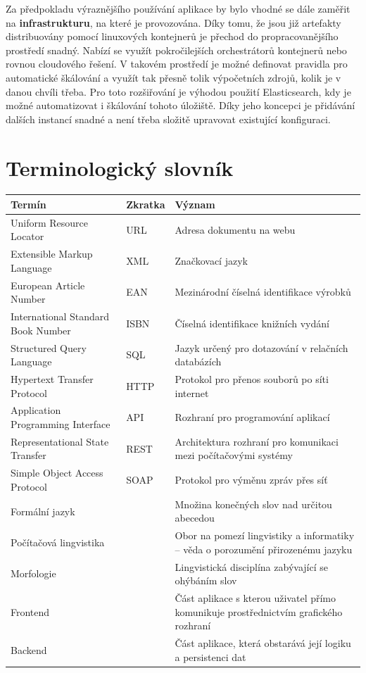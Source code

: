 \documentclass[FM,DP]{tulthesis}
\begin{document}
Za předpokladu výraznějšího používání aplikace by bylo vhodné se dále zaměřit na \textbf{infrastrukturu}, 
na které je provozována. Díky tomu, že jsou již artefakty distribuovány pomocí linuxových kontejnerů
je přechod do propracovanějšího prostředí snadný. Nabízí se využít pokročilejších orchestrátorů
kontejnerů nebo rovnou cloudového řešení. V takovém prostředí je možné definovat pravidla pro automatické
škálování a využít tak přesně tolik výpočetních zdrojů, kolik je v danou chvíli třeba. Pro
toto rozšiřování je výhodou použití Elasticsearch, kdy je možné automatizovat i škálování
tohoto úložiště. Díky jeho koncepci je přidávání dalších instancí snadné a není třeba složitě
upravovat existující konfiguraci.

\appendix

\chapter{Terminologický slovník}

\begin{center}

\begin{tabular}{L{50mm} L{17mm} L{73mm}} 
\toprule
\textbf{Termín} & \textbf{Zkratka} & \textbf{Význam} \\
\midrule
Uniform Resource Locator & URL & Adresa dokumentu na webu\\
\hline
Extensible Markup Language & XML & Značkovací jazyk\\
\hline
European Article Number & EAN & Mezinárodní číselná identifikace výrobků\\
\hline
International Standard Book Number & ISBN & Číselná identifikace knižních vydání\\
\hline
Structured Query Language & SQL & Jazyk určený pro dotazování v relačních databázích\\
\hline
Hypertext Transfer Protocol & HTTP & Protokol pro přenos souborů po síti internet\\
\hline
Application Programming Interface & API & Rozhraní pro programování aplikací\\
\hline
Representational State Transfer & REST & Architektura rozhraní pro komunikaci mezi počítačovými systémy\\
\hline
Simple Object Access Protocol & SOAP & Protokol pro výměnu zpráv přes síť\\
\hline
Formální jazyk & & Množina konečných slov nad určitou abecedou\\
\hline
Počítačová lingvistika & & Obor na pomezí lingvistiky a informatiky -- věda o porozumění přirozenému jazyku\\
\hline
Morfologie & & Lingvistická disciplína zabývající se ohýbáním slov\\
\hline
Frontend & & Část aplikace s kterou uživatel přímo komunikuje prostřednictvím grafického rozhraní\\
\hline
Backend & & Část aplikace, která obstarává její logiku a persistenci dat\\
\bottomrule
\end{tabular}

\end{center}
\end{document}
